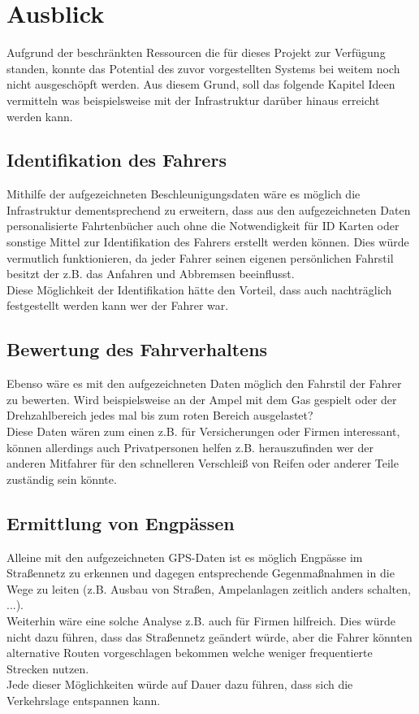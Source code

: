 \chapter{Ausblick}
\label{sec:outlook}
Aufgrund der beschränkten Ressourcen die für dieses Projekt zur Verfügung standen, konnte das Potential des zuvor vorgestellten Systems bei weitem noch nicht ausgeschöpft werden. Aus diesem Grund, soll das folgende Kapitel Ideen vermitteln was beispielsweise mit der Infrastruktur darüber hinaus erreicht werden kann.

\section{Identifikation des Fahrers}
Mithilfe der aufgezeichneten Beschleunigungsdaten wäre es möglich die Infrastruktur dementsprechend zu erweitern, dass aus den aufgezeichneten Daten personalisierte Fahrtenbücher auch ohne die Notwendigkeit für ID Karten oder sonstige Mittel zur Identifikation des Fahrers erstellt werden können. Dies würde vermutlich funktionieren, da jeder Fahrer seinen eigenen persönlichen Fahrstil besitzt der z.B. das Anfahren und Abbremsen beeinflusst. 
\\
Diese Möglichkeit der Identifikation hätte den Vorteil, dass auch nachträglich festgestellt werden kann wer der Fahrer war.

\section{Bewertung des Fahrverhaltens}
Ebenso wäre es mit den aufgezeichneten Daten möglich den Fahrstil der Fahrer zu bewerten. Wird beispielsweise an der Ampel mit dem Gas gespielt oder der Drehzahlbereich jedes mal bis zum roten Bereich ausgelastet?
\\
Diese Daten wären zum einen z.B. für Versicherungen oder Firmen interessant, können allerdings auch Privatpersonen helfen z.B. herauszufinden wer der anderen Mitfahrer für den schnelleren Verschleiß von Reifen oder anderer Teile zuständig sein könnte.

\section{Ermittlung von Engpässen}
\label{SecErmittlungVonEngpaessen}
Alleine mit den aufgezeichneten GPS-Daten ist es möglich Engpässe im Straßennetz zu erkennen und dagegen entsprechende Gegenmaßnahmen in die Wege zu leiten (z.B. Ausbau von Straßen, Ampelanlagen zeitlich anders schalten, ...). 
\\
Weiterhin wäre eine solche Analyse z.B. auch für Firmen hilfreich. Dies würde nicht dazu führen, dass das Straßennetz geändert würde, aber die Fahrer könnten alternative Routen vorgeschlagen bekommen welche weniger frequentierte Strecken nutzen.
\\
Jede dieser Möglichkeiten würde auf Dauer dazu führen, dass sich die Verkehrslage entspannen kann.

